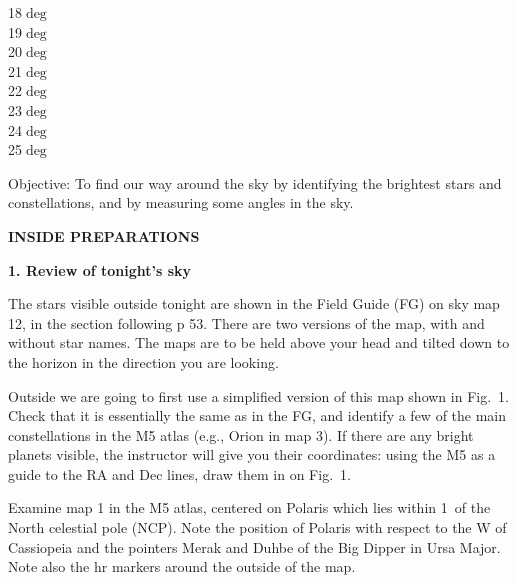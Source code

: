 {\hfill 18$\deg$\makebox[2cm]{\hrulefill} \\
\vspace{-0.028cm}
\hfill 19$\deg$\makebox[2cm]{\hrulefill} \\
\vspace{-0.028cm}
\hfill 20$\deg$\makebox[2cm]{\hrulefill} \\
\vspace{-0.028cm}
\hfill 21$\deg$\makebox[2cm]{\hrulefill} \\
\vspace{-0.028cm}
\hfill 22$\deg$\makebox[2cm]{\hrulefill} \\
\vspace{-0.028cm}
\hfill 23$\deg$\makebox[2cm]{\hrulefill} \\
\vspace{-0.028cm}
\hfill 24$\deg$\makebox[2cm]{\hrulefill} \\
\vspace{-0.028cm}
\hfill 25$\deg$\makebox[2cm]{\hrulefill} \\
}


\bigskip

\noindent
{Objective:} To find our way around the sky by identifying the
brightest stars and constellations, and by measuring some angles
in the sky.

\bigskip\noindent
{\bf INSIDE PREPARATIONS}
\bigskip

\noindent
{\bf 1. Review of tonight's sky}

\medskip
\noindent
The stars visible outside tonight are shown in the Field Guide (FG) on
sky map 12, in the section following p 53. There are two versions of
the map, with and without star names. The maps are to be held above
your head and tilted down to the horizon in the direction you are
looking.

Outside we are going to first use a simplified version of this map
shown in Fig.~1. Check that it is essentially the same as in the FG,
and identify a few of the main constellations in the M5 atlas (e.g.,
Orion in map 3). If there are any bright planets visible, the instructor
will give you their coordinates: using the M5 as a guide to the RA and
Dec lines, draw them in on Fig.~1.

Examine map 1 in the M5 atlas, centered on Polaris which lies within
1\deg\ of the North celestial pole (NCP). Note the position of Polaris
with respect to the W of Cassiopeia and the pointers Merak and Duhbe
of the Big Dipper in Ursa Major. Note also the hr markers around the
outside of the map.

